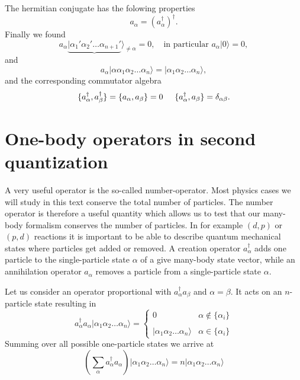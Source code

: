\documentclass[graybox,sectrefs,envcountresetchap,open=right]{svmonodo}
\begin{document}
The hermitian conjugate has the folowing properties
\[
        a_{\alpha} = ( a_{\alpha}^{\dagger} )^{\dagger}.
\]
Finally we found 
\[
	a_\alpha\underbrace{|\alpha_1'\alpha_2' \dots \alpha_{n+1}'}\rangle_{\neq \alpha} = 0, \quad
		\textrm{in particular } a_\alpha |0\rangle = 0,
\]
and
\[
 a_\alpha |\alpha\alpha_1\alpha_2 \dots \alpha_{n}\rangle = |\alpha_1\alpha_2 \dots \alpha_{n}\rangle,
\]
and the corresponding commutator algebra
\[
	\{a_{\alpha}^{\dagger},a_{\beta}^{\dagger}\} = \{a_{\alpha},a_{\beta}\} = 0 \hspace{0.5cm} 
\{a_\alpha^{\dagger},a_\beta \} = \delta_{\alpha\beta}.
\]

\section{One-body operators in second quantization}

A very useful operator is the so-called number-operator.  Most physics cases  we will
study in this text conserve the total number of particles.  The number operator is therefore
a useful quantity which allows us to test that our many-body formalism  conserves the number of particles.
In for example $(d,p)$ or $(p,d)$ reactions it is important to be able to describe quantum mechanical states
where particles get added or removed.
A creation operator $a_\alpha^{\dagger}$ adds one particle to the single-particle state
$\alpha$ of a give many-body state vector, while an annihilation operator $a_\alpha$ 
removes a particle from a single-particle
state $\alpha$. 





Let us consider an operator proportional with $a_\alpha^{\dagger} a_\beta$ and 
$\alpha=\beta$. It acts on an $n$-particle state 
resulting in
\begin{equation}
	a_\alpha^{\dagger} a_\alpha |\alpha_1\alpha_2 \dots \alpha_{n}\rangle = 
	\begin{cases}
		0  &\alpha \notin \{\alpha_i\} \\
		\\
		|\alpha_1\alpha_2 \dots \alpha_{n}\rangle & \alpha \in \{\alpha_i\}
	\end{cases}
\end{equation}
Summing over all possible one-particle states we arrive at
\begin{equation}
	\left( \sum_\alpha a_\alpha^{\dagger} a_\alpha \right) |\alpha_1\alpha_2 \dots \alpha_{n}\rangle = 
	n |\alpha_1\alpha_2 \dots \alpha_{n}\rangle \label{eq:2-21}
\end{equation}
\end{document}

